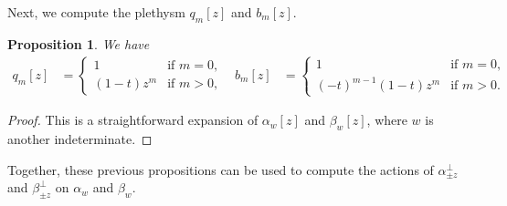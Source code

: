\documentclass[12pt]{amsart}%
\newtheorem{proposition}[theorem]{Proposition}
\theoremstyle{remark}
\theoremstyle{definition}
\begin{document}
    Next, we compute the plethysm $q_m[z]$ and $b_m[z]$.

    \begin{proposition}
        We have
        \begin{align*}
            q_m[z]&=
                \begin{cases}
                    1&\text{if }m=0,\\
                    (1-t)z^m&\text{if }m>0,
                \end{cases}&
            b_m[z]&=
                \begin{cases}
                    1&\text{if }m=0,\\
                    (-t)^{m-1}(1-t)z^m&\text{if }m>0.
                \end{cases}
        \end{align*}
    \end{proposition}

    \begin{proof}
        This is a straightforward expansion of $\alpha_w[z]$ and $\beta_w[z]$, where $w$ is another indeterminate.
    \end{proof}

    Together, these previous propositions can be used to compute the actions of $\alpha_{\pm z}^\perp$ and $\beta_{\pm z}^\perp$ on $\alpha_w$ and $\beta_w$.
    
\end{document}
